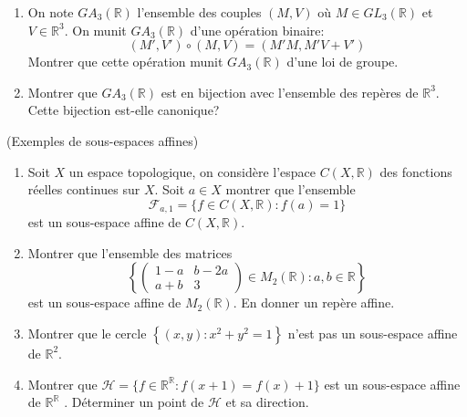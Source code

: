 \documentclass[a4paper,12pt,reqno]{amsart}
\begin{document}
\begin{exo}
\begin{enumerate}
    \item\hard On note $GA_{3}(\mathbb{R})$ l'ensemble des couples $(M,V)$ où $M\in GL_{3}(\mathbb{R})$ et $V\in\mathbb{R}^{3}$. On munit $GA_{3}(\mathbb{R})$ d'une opération binaire:\vspace{-3mm}
      \[
        (M',V')\circ(M,V)=(M'M,M'V+V')
      \]
    Montrer que cette opération munit $GA_{3}(\mathbb{R})$ d'une loi de groupe.

    \item\hard Montrer que $GA_{3}(\mathbb{R})$ est en bijection avec l'ensemble des repères de $\mathbb{R}^{3}$. \\
    Cette bijection est-elle canonique?
  \end{enumerate}
\end{exo}

\begin{exo} (Exemples de sous-espaces affines)
  \begin{enumerate}

  \item Soit $X$ un espace topologique, on considère l'espace $C(X,\mathbb{R})$ des fonctions réelles continues sur $X$. Soit $a \in X$ montrer que l'ensemble
    \[
      \mathcal{F}_{a,1}=\{ f \in C(X,\mathbb{R}) : f(a)=1 \}
    \]
  est un sous-espace affine de $C(X,\mathbb{R})$.

  \item Montrer que l'ensemble des matrices
    \[
      \left\{
        \left(
          \begin{array}{cc}
            1-a & b-2a\\
            a+b & 3
          \end{array}
        \right) \in M_{2}(\mathbb{R})
        : a,b \in \mathbb{R}
      \right\}
    \]
  est un sous-espace affine de $M_{2}(\mathbb{R})$. En donner un repère affine.

  \item Montrer que le cercle $\left\{ (x,y) : x^{2}+y^{2} = 1 \right\} $ n'est
  pas un sous-espace affine de $\mathbb{R}^{2}$.

  \item Montrer que $\mathcal{H} = \{ f \in \mathbb{R}^{\mathbb{R}} : f(x+1)=f(x)+1\}$
  est un sous-espace affine de $\mathbb{R}^{\mathbb{R}}$ . Déterminer
  un point de $\mathcal{H}$ et sa direction.
  \end{enumerate}
\end{exo}
\end{document}
